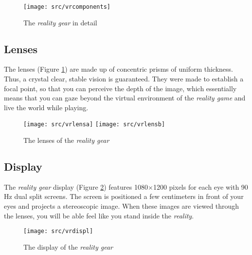 \begin{figure}[!ht]
\begin{center}
\texttt{[image: src/vrcomponents]}
\end{center}
\caption[The \emph{\pokeT{} reality gear} in detail]{The \emph{\poke{} reality gear} in detail}
\end{figure}

\subsection{Lenses} 
The lenses (Figure \ref{vrlens}) are made up of concentric prisms of uniform thickness. Thus, a crystal clear, stable vision is guaranteed. They were made to establish a focal point, so that you can perceive the depth of the image, which essentially means that you can gaze beyond the virtual environment of the \emph{\poke{} reality game} and live the world while playing.

\begin{figure}[!ht]
\begin{center}
\texttt{[image: src/vrlensa]}
\texttt{[image: src/vrlensb]}
\end{center}
\caption[The lenses of the \emph{\pokeT{} reality gear}]{The lenses of the \emph{\poke{} reality gear}}
\label{vrlens}
\end{figure}

\subsection{Display}
The \emph{\poke{} reality gear} display (Figure \ref{vrdisplay}) features 1080$\times$1200 pixels for each eye with 90 Hz dual split screens. The screen is positioned a few centimeters in front of your eyes and projects a stereoscopic image. When these images are viewed through the lenses, you will be able feel like you stand inside the \emph{\poke{} reality}.

\begin{figure}[!ht]
\begin{center}
\texttt{[image: src/vrdispl]}
\end{center}
\caption[The display of the \emph{\pokeT{} reality gear}]{The display of the \emph{\poke{} reality gear}}
\label{vrdisplay}
\end{figure}

